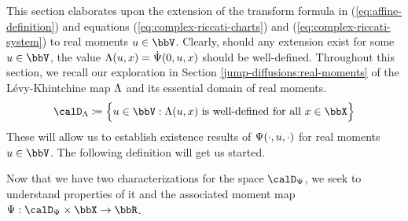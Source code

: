 This section elaborates upon the extension of the transform formula in (\ref{eq:affine-definition}) and equations (\ref{eq:complex-riccati-charts}) and (\ref{eq:complex-riccati-system}) to real moments $\momentVar \in \vecSpace$. 
Clearly, should any extension exist for some $\momentVar \in \vecSpace$, the value $\Lambda(u, x) = \dot{\Psi}(0,u,x)$ should be well-defined.
Throughout this section, we recall our exploration in Section \ref{jump-diffusions:real-moments} of the L\'evy-Khintchine map $\Lambda$ and its essential domain of real moments.
\begin{equation*}
  \odeSpace \defeq \Big\{ \momentVar \in \vecSpace : \ode(\momentVar, \stateVar) \text{ is well-defined for all } \stateVar \in \stateSpace \Big\}
\end{equation*}
These will allow us to establish existence results of $\Psi(\cdot, u, \cdot)$ for real moments $\momentVar \in \vecSpace$.
The following definition will get us started.





Now that we have two characterizations for the space $\momentSpace$, we seek to understand properties of it and the associated moment map $\aff: \momentSpace \times \stateSpace \rightarrow \bbR$.





